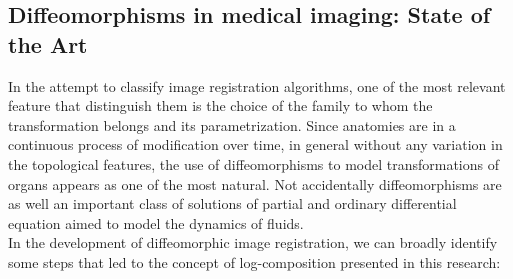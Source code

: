 \subsection{Diffeomorphisms in medical imaging: State of the Art}

In the attempt to classify image registration algorithms, one of the most relevant feature that distinguish them is the choice of the family to whom the transformation belongs and its parametrization. Since anatomies are in a continuous process of modification over time, in general without any variation in the topological features, the use of diffeomorphisms to model transformations of organs appears as one of the most natural. Not accidentally diffeomorphisms are as well an important class of solutions of partial and ordinary differential equation aimed to model the dynamics of fluids. \\
In the development of diffeomorphic image registration, we can broadly identify some steps that led to the concept of log-composition presented in this research:
